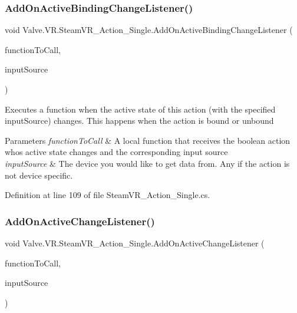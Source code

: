 \subsubsection{\texorpdfstring{AddOnActiveBindingChangeListener()}{AddOnActiveBindingChangeListener()}}
{\footnotesize\ttfamily void Valve.\+V\+R.\+Steam\+V\+R\+\_\+\+Action\+\_\+\+Single.\+Add\+On\+Active\+Binding\+Change\+Listener (\begin{DoxyParamCaption}\item[{\mbox{\hyperlink{class_valve_1_1_v_r_1_1_steam_v_r___action___single_a45ad70dbb8a58191f373b7ae098b833b}{Active\+Change\+Handler}}}]{function\+To\+Call,  }\item[{\mbox{\hyperlink{namespace_valve_1_1_v_r_a82e5bf501cc3aa155444ee3f0662853f}{Steam\+V\+R\+\_\+\+Input\+\_\+\+Sources}}}]{input\+Source }\end{DoxyParamCaption})}



Executes a function when the active state of this action (with the specified input\+Source) changes. This happens when the action is bound or unbound 


\begin{DoxyParams}{Parameters}
{\em function\+To\+Call} & A local function that receives the boolean action who\textquotesingle{}s active state changes and the corresponding input source\\
\hline
{\em input\+Source} & The device you would like to get data from. Any if the action is not device specific.\\
\hline
\end{DoxyParams}


Definition at line 109 of file Steam\+V\+R\+\_\+\+Action\+\_\+\+Single.\+cs.

\mbox{\label{class_valve_1_1_v_r_1_1_steam_v_r___action___single_a7c280e8752917180b21bbf4d953d4243}} 
\subsubsection{\texorpdfstring{AddOnActiveChangeListener()}{AddOnActiveChangeListener()}}
{\footnotesize\ttfamily void Valve.\+V\+R.\+Steam\+V\+R\+\_\+\+Action\+\_\+\+Single.\+Add\+On\+Active\+Change\+Listener (\begin{DoxyParamCaption}\item[{\mbox{\hyperlink{class_valve_1_1_v_r_1_1_steam_v_r___action___single_a45ad70dbb8a58191f373b7ae098b833b}{Active\+Change\+Handler}}}]{function\+To\+Call,  }\item[{\mbox{\hyperlink{namespace_valve_1_1_v_r_a82e5bf501cc3aa155444ee3f0662853f}{Steam\+V\+R\+\_\+\+Input\+\_\+\+Sources}}}]{input\+Source }\end{DoxyParamCaption})}




